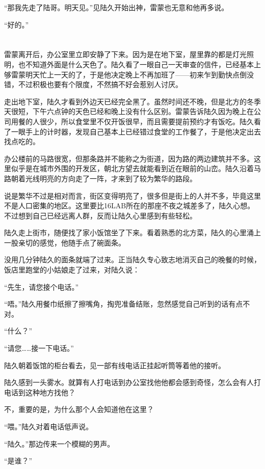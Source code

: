 “那我先走了陆哥。明天见。”见陆久开始出神，雷蒙也无意和他再多说。

“好的。”



\section*{}

雷蒙离开后，办公室里立即安静了下来。因为是在地下室，屋里靠的都是灯光照明，也不知道外面是什么天色了。陆久看了一眼自己一天审查的信件，已经基本上够雷蒙明天忙上一天的了，于是他决定晚上不再加班了——初来乍到勤快点倒没错，不过积极也要有个限度，不然搞不好会惹别人讨厌。

走出地下室，陆久才看到外边天已经完全黑了。虽然时间还不晚，但是北方的冬季天很短，下午六点钟的天色已经和晚上没有什么区别。雷蒙告诉陆久因为晚上在公司用餐的人很少，所以食堂里不仅开饭很早，而且需要提前预约才有饭吃。陆久看了一眼手上的计时器，发现自己基本上已经错过食堂的工作餐了，于是他决定出去找点吃的。

办公楼前的马路很宽，但那条路并不能称之为街道，因为路的两边建筑并不多。这里似乎是在城市外围的开发区，朝北方望去就能看到近在眼前的山峦。陆久沿着马路朝着光线明亮的方向走了一阵，才来到了较为繁华的路段。

说是繁华不过是相对而言，街区变得明亮了，很多但是街上的人并不多，毕竟这里不是人口密集的地区。这里要比16LAB所在的那座不夜之城差多了，陆久心想。不过想到自己已经远离人群，反而让陆久心里感到有些轻松。

陆久走上街市，随便找了家小饭馆坐了下来。看着熟悉的北方菜，陆久的心里涌上一股亲切的感觉，他随手点了碗面条。

没用几分钟陆久的面条就端了过来。正当陆久专心致志地消灭自己的晚餐的时候，饭店里跑堂的小姑娘走了过来，对陆久说：

“先生，请您接个电话。”

“唔。”陆久用餐巾纸擦了擦嘴角，掏兜准备结账，忽然感觉自己听到的话有点不对。

“什么？”

“请您……接一下电话。”

陆久朝着饭馆的柜台看去，见一部有线电话正挂起听筒等着他的接听。

陆久感到一头雾水。就算有人打电话到办公室找他他都会感到奇怪，怎么会有人打电话到这种地方找他？

不，重要的是，为什么那个人会知道他在这里？

“喂。”陆久对着电话低声说。

“陆久。”那边传来一个模糊的男声。

“是谁？”

